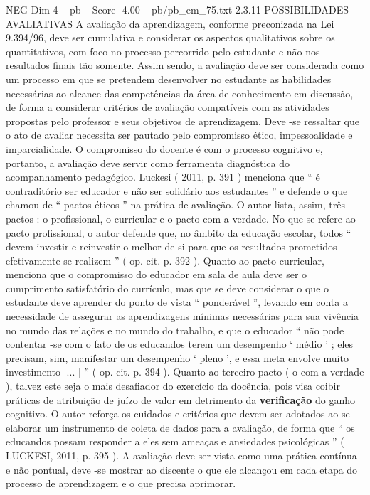 \begin{textsample}{NEG Dim 4 – pb – Score -4.00 – pb/pb\_em\_75.txt}  \label{ex:f4_neg_021}
2.3.11 POSSIBILIDADES AVALIATIVAS A avaliação da aprendizagem, conforme preconizada na Lei 9.394/96, deve ser cumulativa e considerar os aspectos qualitativos sobre os quantitativos, com foco no processo percorrido pelo estudante e não nos resultados finais tão somente.
Assim sendo, a avaliação deve ser considerada como um processo em que se pretendem desenvolver no estudante as habilidades necessárias ao alcance das competências da área de conhecimento em discussão, de forma a considerar critérios de avaliação compatíveis com as atividades propostas pelo professor e seus objetivos de aprendizagem.
Deve -se ressaltar que o ato de avaliar necessita ser pautado pelo compromisso ético, impessoalidade e imparcialidade.
O compromisso do docente é com o processo cognitivo e, portanto, a avaliação deve servir como ferramenta diagnóstica do acompanhamento pedagógico.
Luckesi ( 2011, p. 391 ) menciona que “ é contraditório ser educador e não ser solidário aos estudantes ” e defende o que chamou de “ pactos éticos ” na prática de avaliação.
O autor lista, assim, três pactos : o profissional, o curricular e o pacto com a verdade.
No que se refere ao pacto profissional, o autor defende que, no âmbito da educação escolar, todos “ devem investir e reinvestir o melhor de si para que os resultados prometidos efetivamente se realizem ” ( op. cit. p. 392 ).
Quanto ao pacto curricular, menciona que o compromisso do educador em sala de aula deve ser o cumprimento satisfatório do currículo, mas que se deve considerar o que o estudante deve aprender do ponto de vista “ ponderável ”, levando em conta a necessidade de assegurar as aprendizagens mínimas necessárias para sua vivência no mundo das relações e no mundo do trabalho, e que o educador “ não pode contentar -se com o fato de os educandos terem um desempenho ‘ médio ’ ; eles precisam, sim, manifestar um desempenho ‘ pleno ’, e essa meta envolve muito investimento [... ] ” ( op. cit. p. 394 ).
Quanto ao terceiro pacto ( o com a verdade ), talvez este seja o mais desafiador do exercício da docência, pois visa coibir práticas de atribuição de juízo de valor em detrimento da \textbf{verificação} do ganho cognitivo.
O autor reforça os cuidados e critérios que devem ser adotados ao se elaborar um instrumento de coleta de dados para a avaliação, de forma que “ os educandos possam responder a eles sem ameaças e ansiedades psicológicas ” ( LUCKESI, 2011, p. 395 ).
A avaliação deve ser vista como uma prática contínua e não pontual, deve -se mostrar ao discente o que ele alcançou em cada etapa do processo de aprendizagem e o que precisa aprimorar.

\end{textsample}
